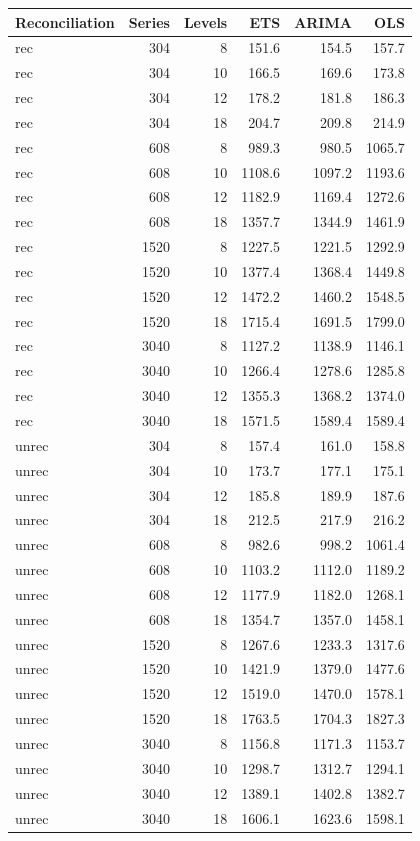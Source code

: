 \documentclass[11pt,a4paper,]{article}
\let\origtable\table
\let\endorigtable\endtable
\renewenvironment{table}[1][2] {
    \expandafter\origtable\expandafter[!htbp]
} {
    \endorigtable
}
\begin{document}
\begin{table}[!h]
\caption{\label{tab:TourismdatasimfixlevelNS}Mean RMSE on 8, 10, 12 and 18 levels of hierarchy with 304, 608, 1520 and 3040 number of bottom level series for ETS, ARIMA and OLS with and without reconciliation - two years forecast points with 0.5 error value - Fixed origin - Simulated tourism dataset}
\centering
\begin{tabular}[t]{lrrrrr}
\toprule
Reconciliation & Series & Levels & ETS & ARIMA & OLS\\
\midrule
rec & 304 & 8 & 151.6 & 154.5 & 157.7\\
rec & 304 & 10 & 166.5 & 169.6 & 173.8\\
rec & 304 & 12 & 178.2 & 181.8 & 186.3\\
rec & 304 & 18 & 204.7 & 209.8 & 214.9\\
rec & 608 & 8 & 989.3 & 980.5 & 1065.7\\
rec & 608 & 10 & 1108.6 & 1097.2 & 1193.6\\
rec & 608 & 12 & 1182.9 & 1169.4 & 1272.6\\
rec & 608 & 18 & 1357.7 & 1344.9 & 1461.9\\
rec & 1520 & 8 & 1227.5 & 1221.5 & 1292.9\\
rec & 1520 & 10 & 1377.4 & 1368.4 & 1449.8\\
rec & 1520 & 12 & 1472.2 & 1460.2 & 1548.5\\
rec & 1520 & 18 & 1715.4 & 1691.5 & 1799.0\\
rec & 3040 & 8 & 1127.2 & 1138.9 & 1146.1\\
rec & 3040 & 10 & 1266.4 & 1278.6 & 1285.8\\
rec & 3040 & 12 & 1355.3 & 1368.2 & 1374.0\\
rec & 3040 & 18 & 1571.5 & 1589.4 & 1589.4\\
unrec & 304 & 8 & 157.4 & 161.0 & 158.8\\
unrec & 304 & 10 & 173.7 & 177.1 & 175.1\\
unrec & 304 & 12 & 185.8 & 189.9 & 187.6\\
unrec & 304 & 18 & 212.5 & 217.9 & 216.2\\
unrec & 608 & 8 & 982.6 & 998.2 & 1061.4\\
unrec & 608 & 10 & 1103.2 & 1112.0 & 1189.2\\
unrec & 608 & 12 & 1177.9 & 1182.0 & 1268.1\\
unrec & 608 & 18 & 1354.7 & 1357.0 & 1458.1\\
unrec & 1520 & 8 & 1267.6 & 1233.3 & 1317.6\\
unrec & 1520 & 10 & 1421.9 & 1379.0 & 1477.6\\
unrec & 1520 & 12 & 1519.0 & 1470.0 & 1578.1\\
unrec & 1520 & 18 & 1763.5 & 1704.3 & 1827.3\\
unrec & 3040 & 8 & 1156.8 & 1171.3 & 1153.7\\
unrec & 3040 & 10 & 1298.7 & 1312.7 & 1294.1\\
unrec & 3040 & 12 & 1389.1 & 1402.8 & 1382.7\\
unrec & 3040 & 18 & 1606.1 & 1623.6 & 1598.1\\
\bottomrule
\end{tabular}
\end{table}
\end{document}
